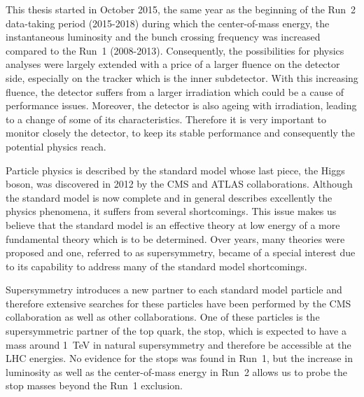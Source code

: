 

This thesis started in October 2015, the same year as the beginning of the Run~2 data-taking period (2015-2018) during which  the center-of-mass energy, the instantaneous luminosity and the bunch crossing frequency was increased compared to the Run~1 (2008-2013). Consequently, the possibilities for physics analyses were largely extended with a price of a larger fluence on the detector side, especially on the tracker which is the inner subdetector. With this increasing fluence, the detector suffers from a larger irradiation which could be a cause of performance issues. Moreover, the detector is also ageing with irradiation, leading to a change of some of its characteristics. Therefore it is very important to monitor closely the detector, to keep its stable performance and consequently the potential physics reach.

Particle physics is described by the standard model whose  last piece, the Higgs boson, was discovered in 2012 by the CMS and ATLAS collaborations. Although the standard model is now complete and in general describes excellently the physics phenomena, it suffers from several shortcomings. This issue makes us believe that the standard model is an effective theory at low energy of a more fundamental theory which is to be determined. Over years, many theories  were proposed and one, referred to as supersymmetry, became of a special interest due to its capability to address many of the standard model shortcomings. 

Supersymmetry introduces a new partner to each standard model particle and therefore extensive searches for these particles have been performed by the CMS collaboration as well as other collaborations. One of these particles is the supersymmetric partner of the top quark, the stop, which is expected to have a mass around 1~TeV in natural supersymmetry and therefore be accessible at the LHC energies. No evidence for the stops was  found in Run~1, but the increase in luminosity as well as the center-of-mass energy in Run~2 allows us to probe the stop masses beyond the Run~1 exclusion. 

